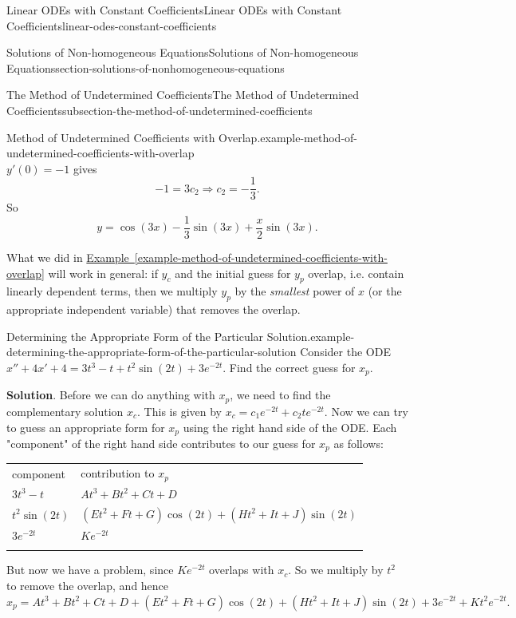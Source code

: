 \documentclass[oneside,10pt,]{book}
\numberwithin{equation}{section}
\newcommand{\hrulethick} {\noalign{\hrule height 0.11em}}
\begin{document}
\begin{chapterptx}{Linear ODEs with Constant Coefficients}{}{Linear ODEs with Constant Coefficients}{}{}{linear-odes-constant-coefficients}
\begin{sectionptx}{Solutions of Non-homogeneous Equations}{}{Solutions of Non-homogeneous Equations}{}{}{section-solutions-of-nonhomogeneous-equations}
\begin{subsectionptx}{The Method of Undetermined Coefficients}{}{The Method of Undetermined Coefficients}{}{}{subsection-the-method-of-undetermined-coefficients}
\begin{example}{Method of Undetermined Coefficients with Overlap.}{example-method-of-undetermined-coefficients-with-overlap}
\begin{equation*}
\end{equation*}
\(y'(0)=-1\) gives%
\begin{equation*}
-1 = 3c_{2}\Rightarrow c_{2} = -\frac{1}{3}.
\end{equation*}
So%
\begin{equation*}
y = \cos(3x)-\frac{1}{3}\sin(3x)+\frac{x}{2}\sin(3x).
\end{equation*}
%
\end{example}
\hypertarget{p-242}{}%
What we did in \hyperref[example-method-of-undetermined-coefficients-with-overlap]{Example~\ref{example-method-of-undetermined-coefficients-with-overlap}} will work in general: if \(y_{c}\) and the initial guess for \(y_{p}\) overlap, i.e. contain linearly dependent terms, then we multiply \(y_{p}\) by the \emph{smallest} power of \(x\) (or the appropriate independent variable) that removes the overlap.%
\begin{example}{Determining the Appropriate Form of the Particular Solution.}{example-determining-the-appropriate-form-of-the-particular-solution}%
\hypertarget{p-243}{}%
Consider the ODE \(x'' + 4x' + 4 = 3t^{3} - t + t^{2}\sin(2t) + 3e^{-2t}.\) Find the correct guess for \(x_{p}\).%
\par\smallskip%
\noindent\textbf{Solution}.\hypertarget{solution-35}{}\quad%
\hypertarget{p-244}{}%
Before we can do anything with \(x_{p}\), we need to find the complementary solution \(x_{c}\). This is given by \(x_{c} = c_{1}e^{-2t} + c_{2}te^{-2t}.\) Now we can try to guess an appropriate form for \(x_{p}\) using the right hand side of the ODE. Each "component" of the right hand side contributes to our guess for \(x_{p}\) as follows: \begin{table}
\centering
\begin{tabular}{ll}\hrulethick
component&contribution to \(x_{p}\)\tabularnewline\hrulethick
\(3t^{3} - t\)&\(At^{3} + Bt^{2} + Ct + D\)\tabularnewline\hrulethick
\(t^{2}\sin(2t)\)&\((Et^{2} + Ft + G)\cos(2t) + (Ht^{2} + It + J)\sin(2t)\)\tabularnewline\hrulethick
\(3e^{-2t}\)&\(Ke^{-2t}\)\tabularnewline\hrulethick
\end{tabular}
\end{table}
 But now we have a problem, since \(Ke^{-2t}\) overlaps with \(x_{c}\). So we multiply by \(t^{2}\) to remove the overlap, and hence \(x_{p} = At^{3} + Bt^{2} + Ct + D + (Et^{2} + Ft + G)\cos(2t) + (Ht^{2} + It + J)\sin(2t) + 3e^{-2t} + Kt^{2}e^{-2t}.\)%
\end{example}
\end{subsectionptx}
\begin{conclusion}{}%

\end{conclusion}
\end{sectionptx}
\end{chapterptx}
\end{document}
